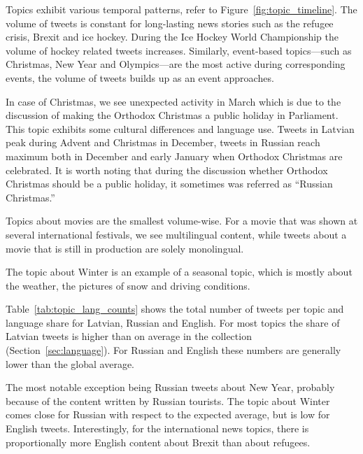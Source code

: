 \documentclass{IOS-Book-Article}
\begin{document}

Topics exhibit various temporal patterns, refer to Figure~\ref{fig:topic_timeline}. The volume of tweets is constant for long-lasting news stories such as the refugee crisis, Brexit and ice hockey.
%
During the Ice Hockey World Championship the volume of hockey related tweets increases. Similarly, event-based topics---such as Christmas, New Year and Olympics---are the most active during corresponding events, the volume of tweets builds up as an event approaches.

In case of Christmas, we see unexpected activity in March which is due to the discussion of making the Orthodox Christmas a public holiday in Parliament. This topic exhibits some cultural differences and language use. Tweets in Latvian peak during Advent and Christmas in December, tweets in Russian reach maximum both in December and early January when Orthodox Christmas are celebrated. It is worth noting that during the discussion whether Orthodox Christmas should be a public holiday, it sometimes was referred as ``Russian Christmas.''

Topics about movies are the smallest volume-wise. For a movie that was shown at several international festivals, we see multilingual content, while tweets about a movie that is still in production are solely monolingual.

The topic about Winter is an example of a seasonal topic, which is mostly about the weather, the pictures of snow and driving conditions.

Table~\ref{tab:topic_lang_counts} shows the total number of tweets per topic and language share for Latvian, Russian and English. For most topics the share of Latvian tweets is higher than on average in the collection (Section~\ref{sec:language}). For Russian and English these numbers are generally lower than the global average.

The most notable exception being Russian tweets about New Year, probably because of the content written by Russian tourists. The topic about Winter comes close for Russian with respect to the expected average, but is low for English tweets. Interestingly, for the international news topics, there is proportionally more English content about Brexit than about refugees.
\end{document}
